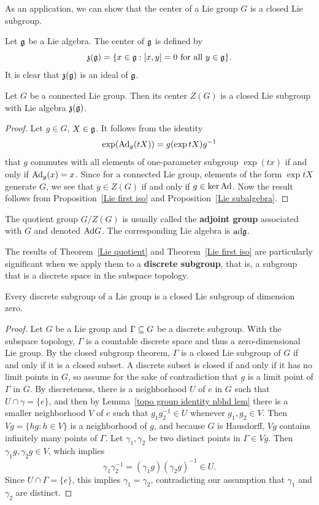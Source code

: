 As an application, we can show that the center of a Lie group $G$ is a closed Lie subgroup.
\begin{definition}
Let $\mathfrak{g}$ be a Lie algebra. The center of $\mathfrak{g}$ is defined by
\[\mathfrak{z}(\mathfrak{g})=\{x\in\mathfrak{g}:[x,y]=0\text{ for all }y\in\mathfrak{g}\}.\]
It is clear that $\mathfrak{z}(\mathfrak{g})$ is an ideal of $\mathfrak{g}$.
\end{definition}
\begin{proposition}
Let $G$ be a connected Lie group. Then its center $Z(G)$ is a closed Lie subgroup with Lie algebra $\mathfrak{z}(\mathfrak{g})$.
\end{proposition}
\begin{proof}
Let $g\in G$, $X\in\mathfrak{g}$. It follows from the identity
\[\exp(\mathrm{Ad}_g(tX))=g(\exp tX)g^{-1}\]
that $g$ commutes with all elements of one-parameter subgroup $\exp(tx)$ if and only if $\mathrm{Ad}_g(x)=x$. Since for a connected Lie group, elements of the form $\exp tX$ generate $G$, we see that $g\in Z(G)$ if and only if $g\in\ker\mathrm{Ad}$. Now the result follows from Proposition~\ref{Lie first iso} and Proposition~\ref{Lie subalgebra}.
\end{proof}
The quotient group $G/Z(G)$ is usually called the \textbf{adjoint group} associated with $G$ and denoted $\mathrm{Ad} G$. The corresponding Lie algebra is $\mathrm{ad}\mathfrak{g}$.\par
The results of Theorem~\ref{Lie quotient} and Theorem~\ref{Lie first iso} are particularly significant when we apply them to a \textbf{discrete subgroup}, that is, a subgroup that is a discrete space in the subspace topology.
\begin{proposition}
Every discrete subgroup of a Lie group is a closed Lie subgroup of dimension zero.
\end{proposition}
\begin{proof}
Let $G$ be a Lie group and $\Gamma\subseteq G$ be a discrete subgroup. With the subspace topology, $\Gamma$ is a countable discrete space and thus a zero-dimensional Lie group. By the closed subgroup theorem, $\Gamma$ is a closed Lie subgroup of $G$ if and only if it is a closed subset. A discrete subset is closed if and only if it has no limit points in $G$, so assume for the sake of contradiction that $g$ is a limit point of $\Gamma$ in $G$. By discreteness, there is a neighborhood $U$ of $e$ in $G$ such that $U\cap\gamma=\{e\}$, and then by Lemma~\ref{topo group identity nbhd lem} there is a smaller neighborhood $V$ of $e$ such that $g_1g_2^{-1}\in U$ whenever $g_1,g_2\in V$. Then $Vg=\{hg:h\in V\}$ is a neighborhood of $g$, and because $G$ is Hausdorff, $Vg$ contains infinitely many points of $\Gamma$. Let $\gamma_1,\gamma_2$ be two distinct points in $\Gamma\in Vg$. Then $\gamma_1g,\gamma_2g\in V$, which implies
\[\gamma_1\gamma_2^{-1}=(\gamma_1g)(\gamma_2g)^{-1}\in U.\]
Since $U\cap\Gamma=\{e\}$, this implies $\gamma_1=\gamma_2$, contradicting our assumption that $\gamma_1$ and $\gamma_2$ are distinct.
\end{proof}
